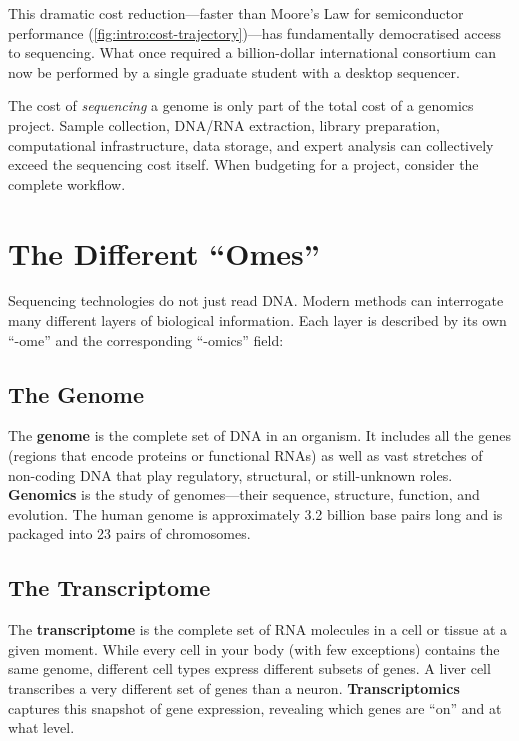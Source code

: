 This dramatic cost reduction---faster than Moore's Law for semiconductor performance (\cref{fig:intro:cost-trajectory})---has fundamentally democratised access to sequencing. What once required a billion-dollar international consortium can now be performed by a single graduate student with a desktop sequencer.

\begin{tipbox}
The cost of \textit{sequencing} a genome is only part of the total cost of a genomics project. Sample collection, DNA/RNA extraction, library preparation, computational infrastructure, data storage, and expert analysis can collectively exceed the sequencing cost itself. When budgeting for a project, consider the complete workflow.
\end{tipbox}


\section{The Different ``Omes''}
\label{sec:intro:omes}

Sequencing technologies do not just read DNA. Modern methods can interrogate many different layers of biological information. Each layer is described by its own ``-ome'' and the corresponding ``-omics'' field:

\subsection{The Genome}
\label{subsec:intro:genome}

The \textbf{genome} is the complete set of DNA in an organism. It includes all the genes (regions that encode proteins or functional RNAs) as well as vast stretches of non-coding DNA that play regulatory, structural, or still-unknown roles. \textbf{Genomics} is the study of genomes---their sequence, structure, function, and evolution. The human genome is approximately 3.2 billion base pairs long and is packaged into 23 pairs of chromosomes.

\subsection{The Transcriptome}
\label{subsec:intro:transcriptome}

The \textbf{transcriptome} is the complete set of RNA molecules in a cell or tissue at a given moment. While every cell in your body (with few exceptions) contains the same genome, different cell types express different subsets of genes. A liver cell transcribes a very different set of genes than a neuron. \textbf{Transcriptomics} captures this snapshot of gene expression, revealing which genes are ``on'' and at what level.

